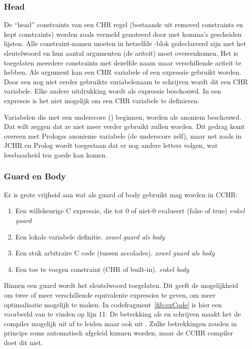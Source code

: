 \subsubsection{Head}

De ``head'' constraints van een CHR regel (bestaande uit removed constraints en kept constraints) worden zoals vermeld genoteerd door met komma's gescheiden lijsten. Alle constraint-namen moeten in hetzelfde -blok gedeclareerd zijn met het  sleutelwoord en hun aantal argumenten (de ariteit) moet overeenkomen. Het is toegelaten meerdere constraints met dezelfde naam maar verschillende ariteit te hebben. Als argument kan een CHR variabele of een expressie gebruikt worden. Door een nog niet eerder gebruikte variabelenaam te schrijven wordt dit een CHR variabele. Elke andere uitdrukking wordt als expressie beschouwd. In een expressie is het niet mogelijk om een CHR variabele te definieren.

Variabelen die met een underscore (\code{\_}) beginnen, worden als anoniem beschouwd. Dat wilt zeggen dat ze niet meer verder gebruikt zullen worden. Dit gedrag komt overeen met Prologss anonieme variabele (de underscore zelf), maar net zoals in JCHR en Prolog wordt toegestaan dat er nog andere letters volgen, wat leesbaarheid ten goede kan komen.

\subsubsection{Guard en Body}

Er is grote vrijheid aan wat als guard of body gebruikt mag worden in CCHR: \begin{enumerate}
  \item Een willekeurige C expressie, die tot 0 of niet-0 evalueert (false of true) {\em enkel guard}
  \item Een lokale variabele definitie. {\em zowel guard als body}
  \item Een stuk arbitraire C code (tussen accolades). {\em zowel guard als body}
  \item Een toe te voegen constraint (CHR of built-in). {\em enkel body}
\end{enumerate}

Binnen een guard wordt het sleutelwoord  toegelaten. Dit geeft de mogelijkheid om twee of meer verschillende equivalente expressies te geven, om meer optimalisatie mogelijk te maken. In codefragment~\ref{fib:exCode} is hier een voorbeeld van te vinden op lijn 11. De betrekking als  en  schrijven maakt het de compiler mogelijk  uit  af te leiden maar ook  uit . Zulke betrekkingen zouden in principe soms automatisch afgeleid kunnen worden, maar de CCHR compiler doet dit niet.

